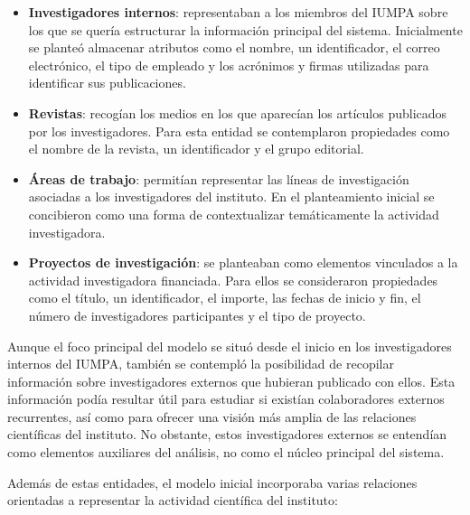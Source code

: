 \documentclass[11pt,spanish,listoffigures,listoftables]{tfgetsinf}
\begin{document}
\begin{itemize}
    \item \textbf{Investigadores internos}: representaban a los miembros del IUMPA sobre los que se quería estructurar la información principal del sistema. Inicialmente se planteó almacenar atributos como el nombre, un identificador, el correo electrónico, el tipo de empleado y los acrónimos y firmas utilizadas para identificar sus publicaciones.

    \item \textbf{Revistas}: recogían los medios en los que aparecían los artículos publicados por los investigadores. Para esta entidad se contemplaron propiedades como el nombre de la revista, un identificador y el grupo editorial.

    \item \textbf{Áreas de trabajo}: permitían representar las líneas de investigación asociadas a los investigadores del instituto. En el planteamiento inicial se concibieron como una forma de contextualizar temáticamente la actividad investigadora.

    \item \textbf{Proyectos de investigación}: se planteaban como elementos vinculados a la actividad investigadora financiada. Para ellos se consideraron propiedades como el título, un identificador, el importe, las fechas de inicio y fin, el número de investigadores participantes y el tipo de proyecto.
\end{itemize}

Aunque el foco principal del modelo se situó desde el inicio en los investigadores internos del IUMPA, también se contempló la posibilidad de recopilar información sobre investigadores externos que hubieran publicado con ellos. Esta información podía resultar útil para estudiar si existían colaboradores externos recurrentes, así como para ofrecer una visión más amplia de las relaciones científicas del instituto. No obstante, estos investigadores externos se entendían como elementos auxiliares del análisis, no como el núcleo principal del sistema.

Además de estas entidades, el modelo inicial incorporaba varias relaciones orientadas a representar la actividad científica del instituto:
\end{document}
